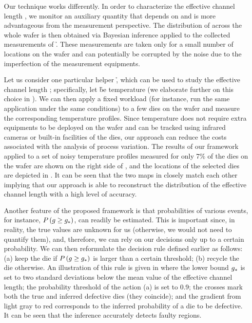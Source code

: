 Our technique works differently. In order to characterize the effective channel
length \g, we monitor an auxiliary quantity \h that depends on \g and is more
advantageous from the measurement perspective. The distribution of \g across the
whole wafer is then obtained via Bayesian inference \cite{gelman2004} applied to
the collected measurements of \h. These measurements are taken only for a small
number of locations on the wafer and can potentially be corrupted by the noise
due to the imperfection of the measurement equipments.

Let us consider one particular helper \h, which can be used to study the
effective channel length \g; specifically, let \h be temperature (we elaborate
further on this choice in ). We can then apply a
fixed workload (for instance, run the same application under the same
conditions) to a few dies on the wafer and measure the corresponding temperature
profiles. Since temperature does not require extra equipments to be deployed on
the wafer and can be tracked using infrared cameras \cite{mesa-martinez2007} or
built-in facilities of the dies, our approach can reduce the costs associated
with the analysis of process variation. The results of our framework applied to
a set of noisy temperature profiles measured for only 7\% of the dies on the
wafer are shown on the right side of , and the locations of the
selected dies are depicted in . It can be seen that the two
maps in  closely match each other implying that our approach is
able to reconstruct the distribution of the effective channel length with a high
level of accuracy.

Another feature of the proposed framework is that probabilities of various
events, for instance, $P\left(g \geq g_*\right)$, can readily be estimated.
This is important since, in reality, the true values are unknown for us
(otherwise, we would not need to quantify them), and, therefore, we can rely on
our decisions only up to a certain probability. We can then reformulate the
decision rule defined earlier as follows: (a) keep the die if $P\left(g
\geq g_*\right)$ is larger than a certain threshold; (b) recycle the die otherwise.
An illustration of this rule is given in  where the lower
bound $g_*$ is set to two standard deviations below the mean value of the
effective channel length; the probability threshold of the action (a) is set to
0.9; the crosses mark both the true and inferred defective dies (they coincide);
and the gradient from light gray to red corresponds to the inferred probability
of a die to be defective. It can be seen that the inference accurately detects
faulty regions.


